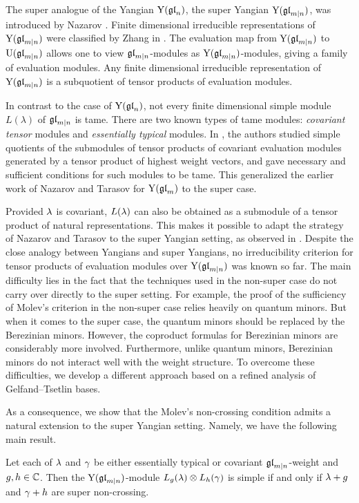 \documentclass[12pt]{amsart}
\begin{document}
The super  analogue of the Yangian ${\rm Y}(\mathfrak{gl}_n)$, the super Yangian ${\rm Y}(\mathfrak{gl}_{m|n})$, was introduced by Nazarov \cite{Naz 1991}.
Finite dimensional irreducible representations of ${\rm Y}(\mathfrak{gl}_{m|n})$ were classified by Zhang in \cite{Zhang 1995, Zhang 1996}.
The evaluation map from ${\rm Y}(\mathfrak{gl}_{m|n})$ to ${\rm U}(\mathfrak{gl}_{m|n})$  allows one to view $\mathfrak{gl}_{m|n}$-modules as ${\rm Y}(\mathfrak{gl}_{m|n})$-modules, giving a family of evaluation modules.
Any finite dimensional irreducible representation of ${\rm Y}(\mathfrak{gl}_{m|n})$ is a subquotient of tensor products of evaluation modules.


In contrast to the case of ${\rm Y}(\mathfrak{gl}_n)$, not every finite dimensional simple module $L(\lambda)$ of $\mathfrak{gl}_{m|n}$ is tame.  There are two known types of tame modules: \emph{covariant tensor} modules and \emph{essentially typical} modules.
In \cite{FLZ 2026}, the authors studied simple quotients of the submodules of  tensor products of covariant evaluation modules generated by a tensor product
of highest weight vectors,  and gave necessary and sufficient conditions for such modules to be tame. This generalized the earlier work of Nazarov and Tarasov \cite{NT 1998} for
${\rm Y}(\mathfrak{gl}_m)$ to the super case.

Provided $\lambda$ is covariant, $L(\lambda)$ can also be obtained as a submodule of a tensor product of natural representations. This makes it possible to adapt the strategy of Nazarov and Tarasov to the super Yangian setting, as observed in \cite{LM 2021}.
Despite the close analogy between Yangians and super Yangians, no irreducibility criterion for tensor products of evaluation modules over ${\rm Y}(\mathfrak{gl}_{m|n})$ was known so far. The main difficulty lies in the fact that the techniques used in the non-super case do not carry over directly to the super setting. For example, the proof of the sufficiency of Molev's criterion in the non-super case relies heavily on quantum minors. But when it comes to the super case, the quantum minors should be replaced by the Berezinian minors. However, the coproduct formulas for Berezinian minors are considerably more involved. Furthermore, unlike quantum minors, Berezinian minors do not interact well with the weight structure. To overcome these difficulties, we develop a different approach based on a refined analysis of Gelfand--Tsetlin bases.

As a consequence, we show that the Molev's non-crossing condition admits a natural extension to the super Yangian setting. Namely, we have the following main result.

\begingroup
\renewcommand{\thethm}{A}
Let each of $\lambda$ and $\gamma$ be either essentially typical or covariant $\mathfrak{gl}_{m|n}$-weight and $g,h\in\mathbb{C}$. Then the ${\rm Y}(\mathfrak{gl}_{m|n})$-module $L_g(\lambda)\otimes L_h(\gamma)$ is simple if and only if  $\lambda+g$ and $\gamma+h$ are super non-crossing.
\eth
\endgroup
\end{document}
